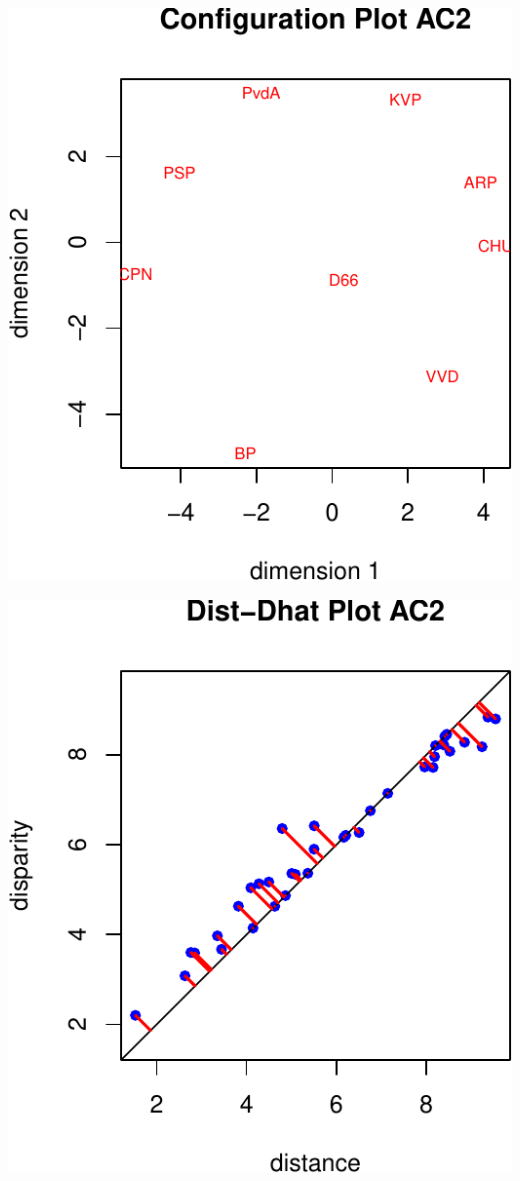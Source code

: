 \documentclass[
  12pt,
]{article}
\begin{document}
\begin{center}\includegraphics{smacofAC_files/figure-latex/gruijterh01-2} \end{center}

\begin{center}\includegraphics{smacofAC_files/figure-latex/gruijterh01-3} \end{center}
\end{document}
